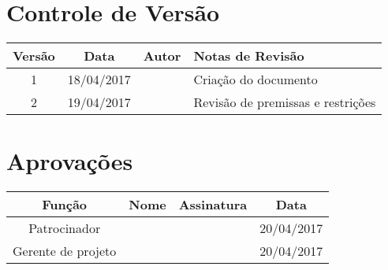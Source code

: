 \section{Controle de Versão}

\begin{table}[H]
	\begin{tabularx}{\textwidth}{| c | c | X | X |}
		\hline
		\textbf{Versão} & \textbf{Data} & \textbf{Autor}        & \textbf{Notas de Revisão}           \\
		\hline
		1                & 18/04/2017    & \projectManagerName{} & Criação do documento               \\
		\hline
		2                & 19/04/2017    & \projectManagerName{} & Revisão de premissas e restrições \\
		\hline
	\end{tabularx}
	\centering
\end{table}

\section{Aprovações}

\begin{table}[H]
	\begin{tabularx}{\textwidth}{| c | c | X | c |}
		\hline
		\textbf{Função}  & \textbf{Nome}         & \textbf{Assinatura}        & \textbf{Data} \\
		\hline
		Patrocinador       & \projectSponsorName{} & \projectSponsorSignature{} & 20/04/2017    \\
		\hline
		Gerente de projeto & \projectManagerName{} & \projectManagerSignature{} & 20/04/2017    \\
		\hline
	\end{tabularx}
	\centering
\end{table}